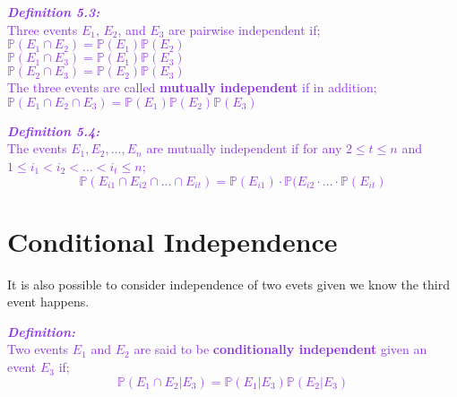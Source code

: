 \documentclass{report}
\newenvironment{cframed}[1][BlueViolet]
  {\begin{tcolorbox}[colframe=#1,colback=white]}
  {\end{tcolorbox}}
\begin{document}
\begin{cframed}
\textcolor{BlueViolet}{\textit{\textbf{Definition 5.3:}}}\\
\textcolor{BlueViolet}{Three events $E_1$, $E_2$, and $E_3$ are pairwise independent if;}\\
\textcolor{BlueViolet}{$\mathbb{P}(E_1 \cap E_2) = \mathbb{P}(E_1)\mathbb{P}(E_2)$}\\
\textcolor{BlueViolet}{$\mathbb{P}(E_1 \cap E_3) = \mathbb{P}(E_1)\mathbb{P}(E_3)$}\\
\textcolor{BlueViolet}{$\mathbb{P}(E_2 \cap E_3) = \mathbb{P}(E_2)\mathbb{P}(E_3)$}\\

\textcolor{BlueViolet}{The three events are called \textbf{mutually independent} if in addition;}\\
\textcolor{BlueViolet}{$\mathbb{P}(E_1 \cap E_2 \cap E_3) = \mathbb{P}(E_1)\mathbb{P}(E_2)\mathbb{P}(E_3) $}
\end{cframed}

\begin{cframed}
\textcolor{BlueViolet}{\textit{\textbf{Definition 5.4:}}}\\
\textcolor{BlueViolet}{The events $E_1,E_2,...,E_n$ are mutually independent if for any $2 \leq t \leq n$ and $1 \leq i_1 < i_2 < ... < i_t \leq n$;}
\textcolor{BlueViolet}{\begin{equation}
    \mathbb{P}(E_{i1} \cap E_{i2} \cap ... \cap E_{it}) = \mathbb{P}(E_{i1}) \cdot \mathbb{P}(E_{i2} \cdot ... \cdot \mathbb{P}(E_{it})
\end{equation}}
\end{cframed}

\section{Conditional Independence}

It is also possible to consider independence of two evets given we know the third event happens.

\begin{cframed}
\textcolor{BlueViolet}{\textit{\textbf{Definition:}}}\\
\textcolor{BlueViolet}{Two events $E_1$ and $E_2$ are said to be \textbf{conditionally independent} given an event $E_3$ if;}
\textcolor{BlueViolet}{\begin{equation}
    \mathbb{P}(E_1 \cap E_2|E_3) = \mathbb{P}(E_1|E_3)\mathbb{P}(E_2|E_3)
\end{equation}}
\end{cframed}
\end{document}
